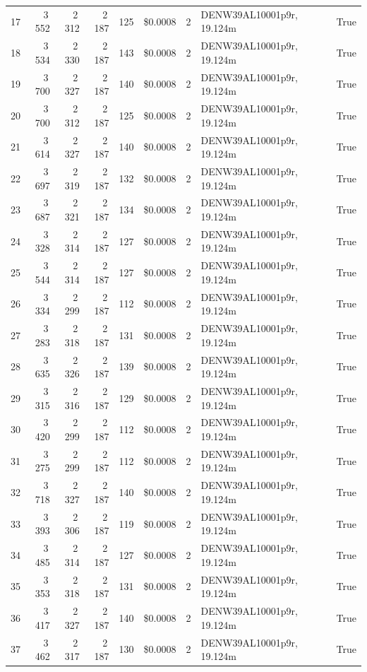 \documentclass[a4paper,11pt]{article}
\begin{document}
\begin{table}[ht]
\begin{tabular}{r r r r r r r p{3cm} l}
17 & 3\,552 & 2\,312 & 2\,187 & 125 & \$0.0008 & 2 & DENW39AL10001p9r, 19.124m & True \\
18 & 3\,534 & 2\,330 & 2\,187 & 143 & \$0.0008 & 2 & DENW39AL10001p9r, 19.124m & True \\
19 & 3\,700 & 2\,327 & 2\,187 & 140 & \$0.0008 & 2 & DENW39AL10001p9r, 19.124m & True \\
20 & 3\,700 & 2\,312 & 2\,187 & 125 & \$0.0008 & 2 & DENW39AL10001p9r, 19.124m & True \\
21 & 3\,614 & 2\,327 & 2\,187 & 140 & \$0.0008 & 2 & DENW39AL10001p9r, 19.124m & True \\
22 & 3\,697 & 2\,319 & 2\,187 & 132 & \$0.0008 & 2 & DENW39AL10001p9r, 19.124m & True \\
23 & 3\,687 & 2\,321 & 2\,187 & 134 & \$0.0008 & 2 & DENW39AL10001p9r, 19.124m & True \\
24 & 3\,328 & 2\,314 & 2\,187 & 127 & \$0.0008 & 2 & DENW39AL10001p9r, 19.124m & True \\
25 & 3\,544 & 2\,314 & 2\,187 & 127 & \$0.0008 & 2 & DENW39AL10001p9r, 19.124m & True \\
26 & 3\,334 & 2\,299 & 2\,187 & 112 & \$0.0008 & 2 & DENW39AL10001p9r, 19.124m & True \\
27 & 3\,283 & 2\,318 & 2\,187 & 131 & \$0.0008 & 2 & DENW39AL10001p9r, 19.124m & True \\
28 & 3\,635 & 2\,326 & 2\,187 & 139 & \$0.0008 & 2 & DENW39AL10001p9r, 19.124m & True \\
29 & 3\,315 & 2\,316 & 2\,187 & 129 & \$0.0008 & 2 & DENW39AL10001p9r, 19.124m & True \\
30 & 3\,420 & 2\,299 & 2\,187 & 112 & \$0.0008 & 2 & DENW39AL10001p9r, 19.124m & True \\
31 & 3\,275 & 2\,299 & 2\,187 & 112 & \$0.0008 & 2 & DENW39AL10001p9r, 19.124m & True \\
32 & 3\,718 & 2\,327 & 2\,187 & 140 & \$0.0008 & 2 & DENW39AL10001p9r, 19.124m & True \\
33 & 3\,393 & 2\,306 & 2\,187 & 119 & \$0.0008 & 2 & DENW39AL10001p9r, 19.124m & True \\
34 & 3\,485 & 2\,314 & 2\,187 & 127 & \$0.0008 & 2 & DENW39AL10001p9r, 19.124m & True \\
35 & 3\,353 & 2\,318 & 2\,187 & 131 & \$0.0008 & 2 & DENW39AL10001p9r, 19.124m & True \\
36 & 3\,417 & 2\,327 & 2\,187 & 140 & \$0.0008 & 2 & DENW39AL10001p9r, 19.124m & True \\
37 & 3\,462 & 2\,317 & 2\,187 & 130 & \$0.0008 & 2 & DENW39AL10001p9r, 19.124m & True \\

\end{tabular}
\end{table}
\end{document}
